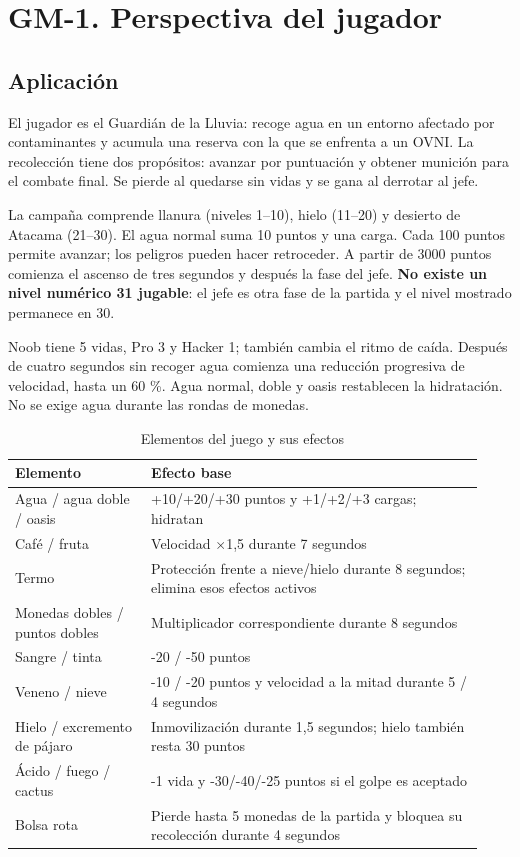 \section{GM-1. Perspectiva del jugador}

\subsection*{Aplicación}

El jugador es el Guardián de la Lluvia: recoge agua en un entorno afectado por contaminantes y acumula una reserva con la que se enfrenta a un OVNI. La recolección tiene dos propósitos: avanzar por puntuación y obtener munición para el combate final. Se pierde al quedarse sin vidas y se gana al derrotar al jefe.

La campaña comprende llanura (niveles 1--10), hielo (11--20) y desierto de Atacama (21--30). El agua normal suma 10 puntos y una carga. Cada 100 puntos permite avanzar; los peligros pueden hacer retroceder. A partir de 3000 puntos comienza el ascenso de tres segundos y después la fase del jefe. \textbf{No existe un nivel numérico 31 jugable}: el jefe es otra fase de la partida y el nivel mostrado permanece en 30.

Noob tiene 5 vidas, Pro 3 y Hacker 1; también cambia el ritmo de caída. Después de cuatro segundos sin recoger agua comienza una reducción progresiva de velocidad, hasta un 60 \%. Agua normal, doble y oasis restablecen la hidratación. No se exige agua durante las rondas de monedas.

{\small
\begin{longtable}{p{0.27\linewidth}p{0.66\linewidth}}
\caption{Elementos del juego y sus efectos}\\
\toprule
Elemento & Efecto base \\
\midrule
\endhead
Agua / agua doble / oasis & +10/+20/+30 puntos y +1/+2/+3 cargas; hidratan \\
Café / fruta & Velocidad $\times$1,5 durante 7 segundos \\
Termo & Protección frente a nieve/hielo durante 8 segundos; elimina esos efectos activos \\
Monedas dobles / puntos dobles & Multiplicador correspondiente durante 8 segundos \\
Sangre / tinta & -20 / -50 puntos \\
Veneno / nieve & -10 / -20 puntos y velocidad a la mitad durante 5 / 4 segundos \\
Hielo / excremento de pájaro & Inmovilización durante 1,5 segundos; hielo también resta 30 puntos \\
Ácido / fuego / cactus & -1 vida y -30/-40/-25 puntos si el golpe es aceptado \\
Bolsa rota & Pierde hasta 5 monedas de la partida y bloquea su recolección durante 4 segundos \\
\bottomrule
\end{longtable}
}

